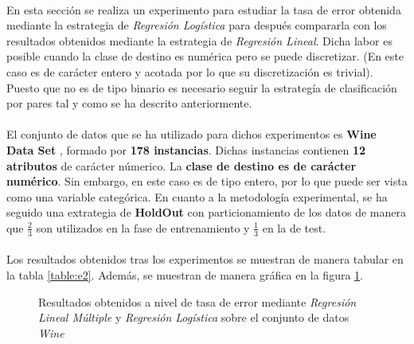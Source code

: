 \documentclass{article}
\begin{document}
		\paragraph{}
		En esta sección se realiza un experimento para estudiar la tasa de error obtenida mediante la estrategia de \emph{Regresión Logística} para después compararla con los resultados obtenidos mediante la estrategia de \emph{Regresión Lineal}. Dicha labor es posible cuando la clase de destino es numérica pero se puede discretizar. (En este caso es de carácter entero y acotada por lo que su discretización es trivial). Puesto que no es de tipo binario es necesario seguir la estrategía de clasificación por pares tal y como se ha descrito anteriormente.

		\paragraph{}
		El conjunto de datos que se ha utilizado para dichos experimentos es \textbf{Wine Data Set} \cite{dataset:wine}, formado por \textbf{178 instancias}. Dichas instancias contienen \textbf{12 atributos} de carácter númerico. La \textbf{clase de destino es de carácter numérico}. Sin embargo, en este caso es de tipo entero, por lo que puede ser vista como una variable categórica. En cuanto a la metodología experimental, se ha seguido una extrategia de \textbf{HoldOut} con particionamiento de los datos de manera que $\frac{2}{3}$ son utilizados en la fase de entrenamiento y $\frac{1}{3}$ en la de test.

		\paragraph{}
		Los resultados obtenidos tras los experimentos se muestran de manera tabular en la tabla \ref{table:e2}. Además, se muestran de manera gráfica en la figura \ref{plot:e2}.


		\begin{figure}[h]
			\begin{center}
			\end{center}
			\caption{Resultados obtenidos a nivel de tasa de error mediante \emph{Regresión Lineal Múltiple} y \emph{Regresión Logística} sobre el conjunto de datos \emph{Wine}}
			\label{plot:e2}
		\end{figure}
\end{document}

